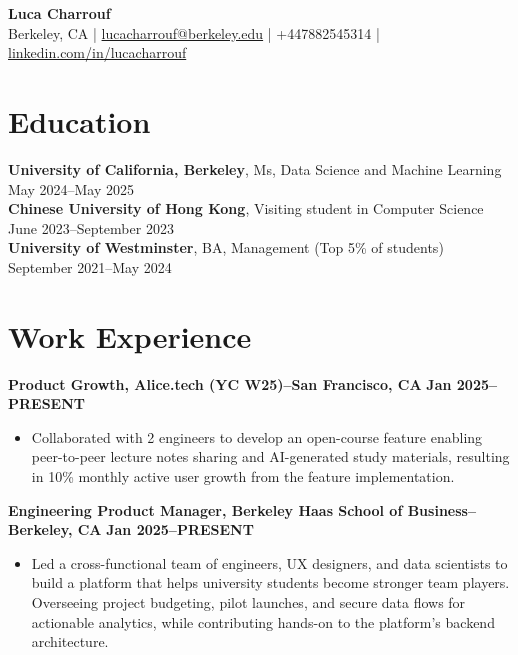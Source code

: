 \documentclass{article}
\begin{document}
\begin{center}
\textbf{\Large Luca Charrouf}\\
\vspace{0.2cm}
Berkeley, CA \quad | \quad \href{mailto:lucacharrouf@berkeley.edu}{lucacharrouf@berkeley.edu} \quad | \quad +447882545314 \quad | \quad \href{https://linkedin.com/in/lucacharrouf}{linkedin.com/in/lucacharrouf}
\end{center}

\section*{Education}
\textbf{University of California, Berkeley}, Ms, Data Science and Machine Learning \hfill May 2024--May 2025\\
\textbf{Chinese University of Hong Kong}, Visiting student in Computer Science \hfill June 2023--September 2023\\
\textbf{University of Westminster}, BA, Management (Top 5\% of students) \hfill September 2021--May 2024\\

\section*{Work Experience}
\textbf{Product Growth, Alice.tech (YC W25)--San Francisco, CA} \hfill \textbf{Jan 2025--PRESENT}
\begin{itemize}[leftmargin=*,noitemsep]
\item Collaborated with 2 engineers to develop an open-course feature enabling peer-to-peer lecture notes sharing and AI-generated study materials, resulting in 10\% monthly active user growth from the feature implementation.
\end{itemize}

\textbf{Engineering Product Manager, Berkeley Haas School of Business--Berkeley, CA} \hfill \textbf{Jan 2025--PRESENT}
\begin{itemize}[leftmargin=*,noitemsep]
\item Led a cross-functional team of engineers, UX designers, and data scientists to build a platform that helps university students become stronger team players. Overseeing project budgeting, pilot launches, and secure data flows for actionable analytics, while contributing hands-on to the platform's backend architecture.
\end{itemize}
\end{document}
